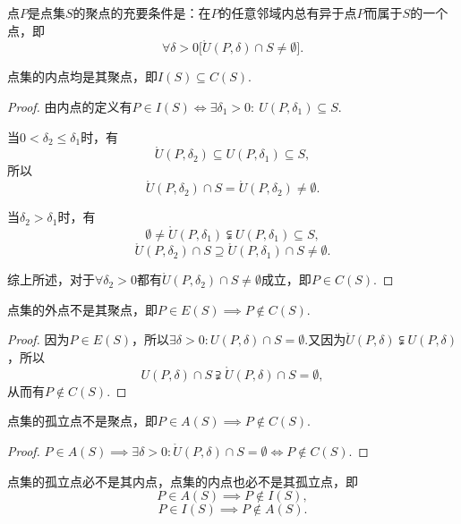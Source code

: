 \begin{theorem}
点\(P\)是点集\(S\)的聚点的充要条件是：在\(P\)的任意邻域内总有异于点\(P\)而属于\(S\)的一个点，即\[
\forall \delta>0 \bigl[
	\mathring{U}(P,\delta) \cap S \neq \emptyset
\bigr].
\]
\end{theorem}

\begin{property}
点集的内点均是其聚点，即\(I(S) \subseteq C(S)\).
\begin{proof}
由内点的定义有\(P \in I(S) \iff \exists \delta_1>0 :\: U(P,\delta_1) \subseteq S\).

当\(0 < \delta_2 \leqslant \delta_1\)时，有\[
\mathring{U}(P,\delta_2)
\subseteq U(P,\delta_1)
\subseteq S,
\]所以\[
\mathring{U}(P,\delta_2) \cap S
= \mathring{U}(P,\delta_2)
\neq \emptyset.
\]

当\(\delta_2 > \delta_1\)时，有\[
\emptyset \neq \mathring{U}(P,\delta_1) \subsetneqq U(P,\delta_1) \subseteq S,
\]\[
\mathring{U}(P,\delta_2) \cap S
\supseteq \mathring{U}(P,\delta_1) \cap S \neq \emptyset.
\]

综上所述，对于\(\forall \delta_2 > 0\)都有\(\mathring{U}(P,\delta_2) \cap S \neq \emptyset\)成立，即\(P \in C(S)\).
\end{proof}
\end{property}

\begin{property}
点集的外点不是其聚点，即\(P \in E(S) \implies P \notin C(S)\).
\begin{proof}
因为\(P \in E(S)\)，所以\(\exists \delta > 0: U(P,\delta) \cap S = \emptyset\).又因为\(\mathring{U}(P,\delta) \subsetneqq U(P,\delta)\)，所以\[
U(P,\delta) \cap S \supsetneqq \mathring{U}(P,\delta) \cap S = \emptyset,
\]从而有\(P \notin C(S)\).
\end{proof}
\end{property}

\begin{property}
点集的孤立点不是聚点，即\(P \in A(S) \implies P \notin C(S)\).
\begin{proof}
\(P \in A(S) \implies \exists \delta > 0 : \mathring{U}(P,\delta) \cap S = \emptyset \iff P \notin C(S)\).
\end{proof}
\end{property}

\begin{property}
点集的孤立点必不是其内点，点集的内点也必不是其孤立点，即\[
P \in A(S) \implies P \notin I(S),
\]\[
P \in I(S) \implies P \notin A(S).
\]
\end{property}

